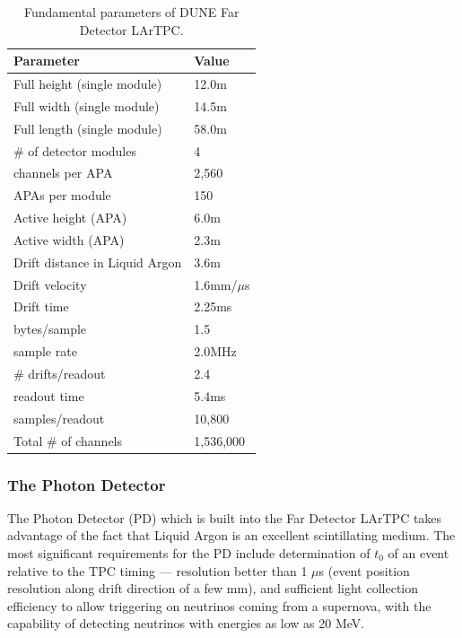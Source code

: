 \begin{table}[ht!]
	\centering
	\begin{tabular}{| p{2.5in} | p{1in} |}
		\hline
		\textbf{Parameter} & \textbf{Value} \\ \hline
		Full height (single module) & 12.0m \\ \hline
		Full width (single module) & 14.5m \\ \hline
		Full length (single module) & 58.0m \\ \hline
		\# of detector modules & 4 \\ \hline
		\hline
		channels per APA & 2,560 \\ \hline
		APAs per module & 150 \\ \hline
		Active height (APA) & 6.0m \\ \hline
		Active width (APA) & 2.3m \\ \hline  \hline
		Drift distance in Liquid Argon & 3.6m \\
		\hline
		Drift velocity & 1.6mm/$\mu$s \\ \hline
		Drift time & 2.25ms \\ \hline
		\hline
		bytes/sample & 1.5 \\ \hline
		sample rate & 2.0MHz \\ \hline
		\# drifts/readout & 2.4 \\ \hline
		\hline
		readout time & 5.4ms \\ \hline
		samples/readout & 10,800 \\
		\hline \hline
		Total \# of channels & 1,536,000 \\
		\hline
	\end{tabular}
	\caption{Fundamental parameters of DUNE Far Detector LArTPC.}
	\label{tab:fundamental-parameters}
\end{table}

\subsubsection{The Photon Detector}
\label{sec:pd}
The Photon Detector (PD) which is built into the Far Detector LArTPC takes advantage of the fact that Liquid Argon
is an excellent scintillating medium.
The most significant requirements for the PD include determination of $t_0$ of an event relative to the TPC timing ---
resolution better than 1 $\mu$s (event position resolution along drift direction of a few mm), and sufficient light
collection efficiency to allow triggering on neutrinos coming from a supernova, with the capability of detecting neutrinos with energies as
low as 20 MeV.

